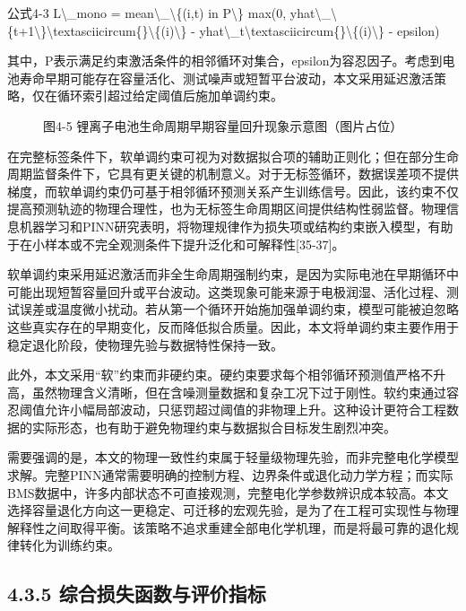\documentclass[12pt, a4paper]{ctexart}
\begin{document}
公式4-3  L\textbackslash{}\_mono = mean\textbackslash{}\_\textbackslash{}\{(i,t) in P\textbackslash{}\} max(0, yhat\textbackslash{}\_\textbackslash{}\{t+1\textbackslash{}\}\textbackslash{}textasciicircum\{\}\textbackslash{}\{(i)\textbackslash{}\} - yhat\textbackslash{}\_t\textbackslash{}textasciicircum\{\}\textbackslash{}\{(i)\textbackslash{}\} - epsilon)


其中，P表示满足约束激活条件的相邻循环对集合，epsilon为容忍因子。考虑到电池寿命早期可能存在容量活化、测试噪声或短暂平台波动，本文采用延迟激活策略，仅在循环索引超过给定阈值后施加单调约束。



\begin{figure}[H]
  \centering
  \caption{图4-5  锂离子电池生命周期早期容量回升现象示意图（图片占位）}
  \label{fig:}
\end{figure}

在完整标签条件下，软单调约束可视为对数据拟合项的辅助正则化；但在部分生命周期监督条件下，它具有更关键的机制意义。对于无标签循环，数据误差项不提供梯度，而软单调约束仍可基于相邻循环预测关系产生训练信号。因此，该约束不仅提高预测轨迹的物理合理性，也为无标签生命周期区间提供结构性弱监督。物理信息机器学习和PINN研究表明，将物理规律作为损失项或结构约束嵌入模型，有助于在小样本或不完全观测条件下提升泛化和可解释性[35-37]。


软单调约束采用延迟激活而非全生命周期强制约束，是因为实际电池在早期循环中可能出现短暂容量回升或平台波动。这类现象可能来源于电极润湿、活化过程、测试误差或温度微小扰动。若从第一个循环开始施加强单调约束，模型可能被迫忽略这些真实存在的早期变化，反而降低拟合质量。因此，本文将单调约束主要作用于稳定退化阶段，使物理先验与数据特性保持一致。


此外，本文采用“软”约束而非硬约束。硬约束要求每个相邻循环预测值严格不升高，虽然物理含义清晰，但在含噪测量数据和复杂工况下过于刚性。软约束通过容忍阈值允许小幅局部波动，只惩罚超过阈值的非物理上升。这种设计更符合工程数据的实际形态，也有助于避免物理约束与数据拟合目标发生剧烈冲突。


需要强调的是，本文的物理一致性约束属于轻量级物理先验，而非完整电化学模型求解。完整PINN通常需要明确的控制方程、边界条件或退化动力学方程；而实际BMS数据中，许多内部状态不可直接观测，完整电化学参数辨识成本较高。本文选择容量退化方向这一更稳定、可迁移的宏观先验，是为了在工程可实现性与物理解释性之间取得平衡。该策略不追求重建全部电化学机理，而是将最可靠的退化规律转化为训练约束。



\subsection{4.3.5 综合损失函数与评价指标}
\end{document}
